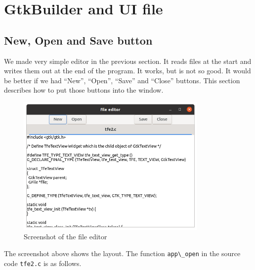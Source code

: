 \section{GtkBuilder and UI file}\label{gtkbuilder-and-ui-file}

\subsection{New, Open and Save button}\label{new-open-and-save-button}

We made very simple editor in the previous section. It reads files at
the start and writes them out at the end of the program. It works, but
is not so good. It would be better if we had ``New'', ``Open'', ``Save''
and ``Close'' buttons. This section describes how to put those buttons
into the window.

\begin{figure}
\centering
\includegraphics[width=9.3cm,height=6.825cm]{../image/screenshot_tfe2.png}
\caption{Screenshot of the file editor}
\end{figure}

The screenshot above shows the layout. The function
\passthrough{\lstinline!app\_open!} in the source code
\passthrough{\lstinline!tfe2.c!} is as follows.

